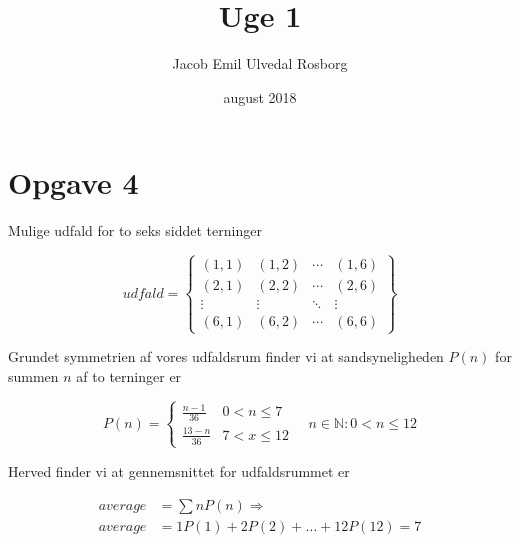 \documentclass[danmark]{../AU}
\title{Uge 1}
\author{Jacob Emil Ulvedal Rosborg}
\date{august 2018}
\begin{document}
\section*{Opgave 4}
Mulige udfald for to seks siddet terninger

\begin{equation}
  udfald = 
  \begin{Bmatrix}
  (1,1) & (1,2) & \cdots & (1,6) \\
  (2,1) & (2,2) & \cdots & (2,6) \\
  \vdots  & \vdots  & \ddots & \vdots  \\
  (6,1) & (6,2) & \cdots & (6,6) 
 \end{Bmatrix}
\end{equation}

Grundet symmetrien af vores udfaldsrum finder vi at sandsyneligheden $P(n)$ for summen $n$ af to terninger er

\begin{equation}
  P(n) = 
  \begin{cases} 
      \frac{n - 1}{36} & 0 < n \leq 7 \\
      \frac{13 - n}{36} & 7 < x \leq 12
   \end{cases}
   \quad n \in \mathbb{N} : 0 < n \leq 12
\end{equation}

Herved finder vi at gennemsnittet for udfaldsrummet er

\begin{align}
  average &= \sum n P(n) \Rightarrow \\
  average &= 1 P(1) + 2 P(2) + \ldots + 12 P(12) = 7
\end{align}
\end{document}

